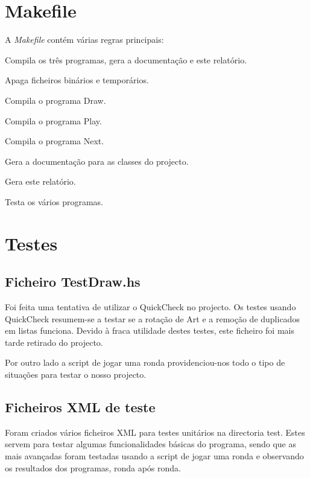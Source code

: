 \documentclass[11pt, a4paper, twoside]{article}
\begin{document}
\section{Makefile}
A \emph{Makefile} contém várias regras principais:

\begin{description}[style=multiline,leftmargin=2cm,font=\bfseries]
    \item[all] Compila os três programas, gera a documentação e este relatório.
    \item[clean] Apaga ficheiros binários e temporários.
    \item[draw] Compila o programa Draw.
    \item[play] Compila o programa Play.
    \item[next] Compila o programa Next.
    \item[doc] Gera a documentação para as classes do projecto.
    \item[report] Gera este relatório.
    \item[test] Testa os vários programas.
\end{description}


\newpage
\section{Testes}

\subsection[Ficheiro TestDraw.hs (removido)]{Ficheiro TestDraw.hs}
Foi feita uma tentativa de utilizar o QuickCheck no projecto. Os testes usando QuickCheck resumem-se a testar se a rotação de Art e a remoção de duplicados em listas funciona. Devido à fraca utilidade destes testes, este ficheiro foi mais tarde retirado do projecto.

Por outro lado a script de jogar uma ronda providenciou-nos todo o tipo de situações para testar o nosso projecto.

\subsection{Ficheiros XML de teste}
Foram criados vários ficheiros XML para testes unitários na directoria test. Estes servem para testar algumas funcionalidades básicas do programa, sendo que as mais avançadas foram testadas usando a script de jogar uma ronda e observando os resultados dos programas, ronda após ronda.
\end{document}

